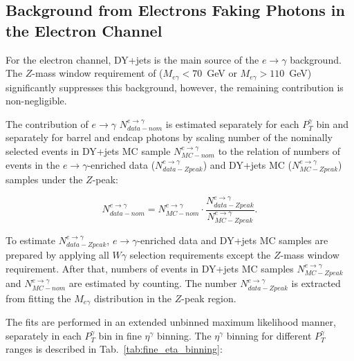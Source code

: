 
\subsection{Background from Electrons Faking Photons in the Electron Channel}
\label{sec:BackgroundSubtraction_etog}

For the electron channel, DY+jets is the main source of the $e \rightarrow \gamma$ background. The $Z$-mass window requirement of ($M_{e\gamma}<70$~GeV or $M_{e\gamma}>110$~GeV) significantly suppresses this background, however, the remaining contribution is non-negligible. 

The contribution of $e\rightarrow\gamma$ $N_{data-nom}^{e\rightarrow\gamma}$ is estimated separately for each $P_{T}^{\gamma}$ bin and separately for barrel and endcap photons by scaling number of the nominally selected events in DY+jets MC sample $N_{MC-nom}^{e\rightarrow\gamma}$ to the relation of numbers of events in the  $e\rightarrow\gamma$-enriched data ($N_{data-Zpeak}^{e\rightarrow\gamma}$) and DY+jets MC ($N_{MC-Zpeak}^{e\rightarrow\gamma}$) samples under the $Z$-peak: 

\begin{equation}\label{eq:Scale_etog}
N_{data-nom}^{e\rightarrow\gamma} = N_{MC-nom}^{e\rightarrow\gamma} \cdot \frac{N_{data-Zpeak}^{e\rightarrow\gamma}}{N_{MC-Zpeak}^{e\rightarrow\gamma}}. 
\end{equation}

To estimate $N_{data-Zpeak}^{e\rightarrow\gamma}$, $e\rightarrow\gamma$-enriched data and DY+jets MC samples are prepared by applying all $W\gamma$ selection requirements except the $Z$-mass window requirement. After that, numbers of events in DY+jets MC samples $N_{MC-Zpeak}^{e\rightarrow\gamma}$ and $N_{MC-nom}^{e\rightarrow\gamma}$ are estimated by counting. The number $N_{data-Zpeak}^{e\rightarrow\gamma}$ is extracted from fitting the $M_{e\gamma}$ distribution in the $Z$-peak region.

The fits are performed in an extended unbinned maximum likelihood manner, separately in each $P_T^\gamma$ bin in fine $\eta^\gamma$ binning. The $\eta^\gamma$ binning for different $P_T^\gamma$ ranges is described in Tab.~\ref{tab:fine_eta_binning}:

